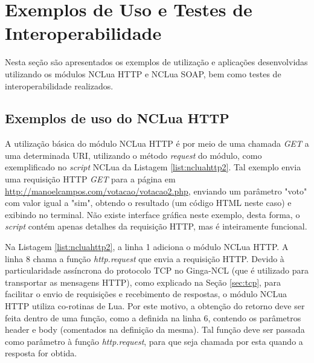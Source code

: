 \begin{comment}
A Figura \ref{fig:class-diagram-ncluasoap-ncluahttp} apresenta um diagrama de classes
dos módulos implementados e suas dependências. Nele pode-se ver que são utilizados
mais dois módulos auxiliares: util e base64, o primeiro contendo funções de uso geral
e o outro contendo rotinas para codificação e decoficação de dados em formato base64,
utilizado, por exemplo, na criptografia da senha do usuário em requisições que requerem autentição HTTP.

\begin{center}
	\texttt{[image: ncluasoap-class-diagram.png]}
	\captionof{figure}{Diagrama de Classes do NCLua SOAP e NCLua HTTP}
	\label{fig:class-diagram-ncluasoap-ncluahttp}
\end{center}
\end{comment}

\section{Exemplos de Uso e Testes de Interoperabilidade} \label{sec:resultados}

Nesta seção são apresentados os exemplos de utilização e aplicações desenvolvidas utilizando os módulos
NCLua HTTP e NCLua SOAP, bem como testes de interoperabilidade realizados.

\subsection{Exemplos de uso do NCLua HTTP}

A utilização básica do módulo NCLua HTTP é por meio de uma chamada \textit{GET}
a uma determinada URI, utilizando o método \textit{request} do módulo, como exemplificado no \textit{script}
NCLua da Listagem \ref{list:ncluahttp2}. Tal exemplo envia uma requisição HTTP \textit{GET} para a página
em \url{http://manoelcampos.com/votacao/votacao2.php}, enviando um parâmetro "voto" com valor igual a "sim",
obtendo o resultado (um código HTML neste caso) e exibindo no terminal. 
Não existe interface gráfica neste exemplo, 
desta forma, o \textit{script} contém apenas detalhes da requisição HTTP, mas é inteiramente funcional.

Na Listagem \ref{list:ncluahttp2}, a linha 1 adiciona o módulo NCLua HTTP. 
A linha 8 chama a função \textit{http.request}
que envia a requisição HTTP. Devido à particularidade assíncrona
do protocolo TCP no Ginga-NCL (que é utilizado para transportar as mensagens HTTP), como explicado na Seção \ref{sec:tcp},
para facilitar o envio de requisições e recebimento de respostas,
o módulo NCLua HTTP utiliza co-rotinas de Lua. 
Por este motivo, a obtenção do retorno deve ser feita dentro de uma função, como
a definida na linha 6, contendo os parâmetros header e body (comentados na definição
da mesma). Tal função deve ser passada como parâmetro à função \textit{http.request}, para que seja
chamada por esta quando a resposta for obtida. 

